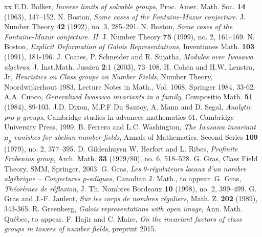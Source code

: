 \documentclass[12pt,a4paper,twoside,english]{smfart}
\def\Z{{\mathbb Z}}
\begin{document}
\begin{thebibliography}{xx}
E.D. Bolker, {\em Inverse limits of solvable groups},  Proc. Amer. Math. Soc. {\bf 14} (1963), 147–152. 
N. Boston, {\em Some cases of the Fontaine-Mazur conjecture}. J. Number Theory {\bf 42} (1992), no. 3, 285–291. 
  N. Boston, {\em Some cases of the Fontaine-Mazur conjecture. II}. J. Number Theory {\bf 75} (1999), no. 2, 161–169.
N. Boston, {\em Explicit Deformation of Galois Representations}, Inventiones Math. {\bf 103} (1991), 181-196.
  J. Coates, P. Schneider and R. Sujatha, {\em Modules over Iwasawa algebras},
 J. Inst.Math. Jussieu {\bf 2}:1 (2003), 73–108.
 H. Cohen and H.W. Lenstra, Jr, {\em Heuristics on Class groups on Number Fields}, Number Theory, Noordwijkerhout 1983, Lecture Notes in Math., Vol. 1068, Springer 1984,  33-62.
A.A. Cuoco, {\em Generalized Iwasawa invariants in a family}, Compositio Math. {\bf 51} (1984), 89-103. 
 J.D. Dixon, M.P.F Du Sautoy, A. Mann  and D. Segal, {\em Analytic pro-$p$-groups}, Cambridge studies in advances mathematics 61, Cambridge University Press, 1999.
 B. Ferrero and L.C. Washington, {\em The Iwasawa invariant $\mu_p$ vanishes for abelian number fields}, Annals of Mathematics. Second Series {\bf 109} (1979), no. 2,  377–395.
 D. Gildenhuysn W. Herfort and L. Ribes, {\em Profinite Frobenius group},  Arch. Math.  {\bf 33} (1979/80), no. 6, 518–528.
G. Gras, Class Field Theory, SMM, Springer, 2003.
G. Gras, {\em Les $\theta$-régulateurs locaux d'un nombre algébrique -- Conjectures $p$-adiques}, Canadian J. Math., to appear. 
 G. Gras, {\em Th\'eor\`emes de r\'eflexion},  J. Th. Nombres Bordeaux {\bf 10} (1998), no. 2, 399–499.
 G. Gras  and J.-F. Jaulent, {\em Sur les corps de nombres r\'eguliers}, Math. Z. {\bf 202} (1989), 343-365.
R. Greenberg, {\em Galois representations with open image},  Ann. Math. Québec, to appear.
F. Hajir and C. Maire, {\em On the invariant factors of class groups in towers of number fields}, preprint 2015.

\end{thebibliography}
\end{document}
